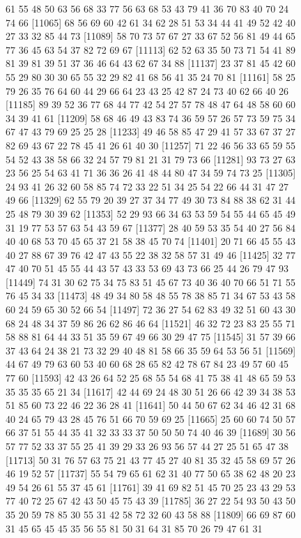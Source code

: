 \documentclass{article}
\begin{document}
\begin{figure}[H]
\begin{Schunk}
\begin{Soutput}
[11041] 61 55 48 50 63 56 68 33 77 56 63 68 53 43 79 41 36 70 83 40 70 24 74 66
[11065] 68 56 69 60 42 61 34 62 28 51 53 34 44 41 49 52 42 40 27 33 32 85 44 73
[11089] 58 70 73 57 67 27 33 67 52 56 81 49 44 65 77 36 45 63 54 37 82 72 69 67
[11113] 62 52 63 35 50 73 71 54 41 89 81 39 81 39 51 37 36 46 64 43 62 67 34 88
[11137] 23 37 81 45 42 60 55 29 80 30 30 65 55 32 29 82 41 68 56 41 35 24 70 81
[11161] 58 25 79 26 35 76 64 60 44 29 66 64 23 43 25 42 87 24 73 40 62 66 40 26
[11185] 89 39 52 36 77 68 44 77 42 54 27 57 78 48 47 64 48 58 60 60 34 39 41 61
[11209] 58 68 46 49 43 83 74 36 59 57 26 57 73 59 75 34 67 47 43 79 69 25 25 28
[11233] 49 46 58 85 47 29 41 57 33 67 37 27 82 69 43 67 22 78 45 41 26 61 40 30
[11257] 71 22 46 56 33 65 59 55 54 52 43 38 58 66 32 24 57 79 81 21 31 79 73 66
[11281] 93 73 27 63 23 56 25 54 63 41 71 36 36 26 41 48 44 80 47 34 59 74 73 25
[11305] 24 93 41 26 32 60 58 85 74 72 33 22 51 34 25 54 22 66 44 31 47 27 49 66
[11329] 62 55 79 20 39 27 37 34 77 49 30 73 84 88 38 62 31 44 25 48 79 30 39 62
[11353] 52 29 93 66 34 63 53 59 54 55 44 65 45 49 31 19 77 53 57 63 54 43 59 67
[11377] 28 40 59 53 35 54 40 27 56 84 40 40 68 53 70 45 65 37 21 58 38 45 70 74
[11401] 20 71 66 45 55 43 40 27 88 67 39 76 42 47 43 55 22 38 32 58 57 31 49 46
[11425] 32 77 47 40 70 51 45 55 44 43 57 43 33 53 69 43 73 66 25 44 26 79 47 93
[11449] 74 31 30 62 75 34 75 83 51 45 67 73 40 36 40 70 66 51 71 55 76 45 34 33
[11473] 48 49 34 80 58 48 55 78 38 85 71 34 67 53 43 58 60 24 59 65 30 52 66 54
[11497] 72 36 27 54 62 83 49 32 51 60 43 30 68 24 48 34 37 59 86 26 62 86 46 64
[11521] 46 32 72 23 83 25 55 71 58 88 81 64 44 33 51 35 59 67 49 66 30 29 47 75
[11545] 31 57 39 66 37 43 64 24 38 21 73 32 29 40 48 81 58 66 35 59 64 53 56 51
[11569] 44 67 49 79 63 60 53 40 60 68 28 65 82 42 78 67 84 23 49 57 60 45 77 60
[11593] 42 43 26 64 52 25 68 55 54 68 41 75 38 41 48 65 59 53 35 35 35 65 21 34
[11617] 42 44 69 24 48 30 51 26 66 42 39 34 38 53 51 85 60 73 22 46 22 36 28 41
[11641] 50 44 50 67 62 34 46 42 31 68 40 24 65 79 43 28 45 76 51 66 70 59 69 25
[11665] 25 60 60 74 50 57 66 37 51 55 44 35 41 32 33 33 37 50 50 50 74 40 46 39
[11689] 30 56 57 77 52 33 37 55 25 41 39 29 33 26 93 56 57 44 27 25 51 65 47 38
[11713] 50 31 76 57 63 75 21 43 77 45 27 40 81 35 32 45 58 69 57 26 46 19 52 57
[11737] 55 54 79 65 61 62 31 40 77 50 65 38 62 48 20 23 49 54 26 61 55 37 45 61
[11761] 39 41 69 82 51 45 70 25 23 43 29 53 77 40 72 25 67 42 43 50 45 75 43 39
[11785] 36 27 22 54 93 50 43 50 35 20 59 78 85 30 55 31 42 58 72 32 60 43 58 88
[11809] 66 69 87 60 31 45 65 45 45 35 56 55 81 50 31 64 31 85 70 26 79 47 61 31

\end{Soutput}
\end{Schunk}
\end{figure}
\end{document}

